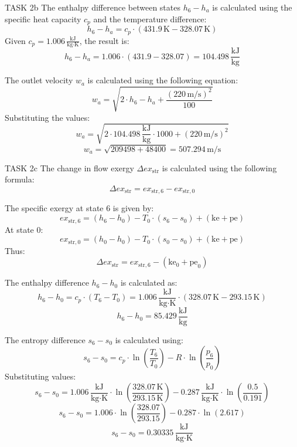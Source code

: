 TASK 2b  
The enthalpy difference between states \( h_6 - h_a \) is calculated using the specific heat capacity \( c_p \) and the temperature difference:  
\[
h_6 - h_a = c_p \cdot (431.9 \, \text{K} - 328.07 \, \text{K})
\]  
Given \( c_p = 1.006 \, \frac{\text{kJ}}{\text{kg·K}} \), the result is:  
\[
h_6 - h_a = 1.006 \cdot (431.9 - 328.07) = 104.498 \, \frac{\text{kJ}}{\text{kg}}
\]  

The outlet velocity \( w_a \) is calculated using the following equation:  
\[
w_a = \sqrt{2 \cdot h_6 - h_a + \frac{(220 \, \text{m/s})^2}{100}}
\]  
Substituting the values:  
\[
w_a = \sqrt{2 \cdot 104.498 \, \frac{\text{kJ}}{\text{kg}} \cdot 1000 + (220 \, \text{m/s})^2}
\]  
\[
w_a = \sqrt{209498 + 48400} = 507.294 \, \text{m/s}
\]  

TASK 2c  
The change in flow exergy \( \Delta ex_{\text{str}} \) is calculated using the following formula:  
\[
\Delta ex_{\text{str}} = ex_{\text{str},6} - ex_{\text{str},0}
\]  

The specific exergy at state 6 is given by:  
\[
ex_{\text{str},6} = (h_6 - h_0) - T_0 \cdot (s_6 - s_0) + (\text{ke} + \text{pe})
\]  
At state 0:  
\[
ex_{\text{str},0} = (h_0 - h_0) - T_0 \cdot (s_0 - s_0) + (\text{ke} + \text{pe})
\]  
Thus:  
\[
\Delta ex_{\text{str}} = ex_{\text{str},6} - (\text{ke}_0 + \text{pe}_0)
\]  

The enthalpy difference \( h_6 - h_0 \) is calculated as:  
\[
h_6 - h_0 = c_p \cdot (T_6 - T_0) = 1.006 \, \frac{\text{kJ}}{\text{kg·K}} \cdot (328.07 \, \text{K} - 293.15 \, \text{K})
\]  
\[
h_6 - h_0 = 85.429 \, \frac{\text{kJ}}{\text{kg}}
\]  

The entropy difference \( s_6 - s_0 \) is calculated using:  
\[
s_6 - s_0 = c_p \cdot \ln\left(\frac{T_6}{T_0}\right) - R \cdot \ln\left(\frac{p_6}{p_0}\right)
\]  
Substituting values:  
\[
s_6 - s_0 = 1.006 \, \frac{\text{kJ}}{\text{kg·K}} \cdot \ln\left(\frac{328.07 \, \text{K}}{293.15 \, \text{K}}\right) - 0.287 \, \frac{\text{kJ}}{\text{kg·K}} \cdot \ln\left(\frac{0.5}{0.191}\right)
\]  
\[
s_6 - s_0 = 1.006 \cdot \ln\left(\frac{328.07}{293.15}\right) - 0.287 \cdot \ln\left(2.617\right)
\]  
\[
s_6 - s_0 = 0.30335 \, \frac{\text{kJ}}{\text{kg·K}}
\]